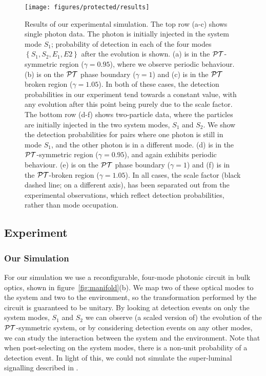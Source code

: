 \begin{figure*}[t]
  \centering
  \texttt{[image: figures/protected/results]}
  \caption[Results of simulation]
    {Results of our experimental simulation. The top row (a-c) shows
    single photon data. The photon is initially injected in the system mode
    \(S_1\); probability of detection in each of the four modes \(\left\{S_1,
    S_2, E_1, E2\right\}\) after the evolution is shown. (a) is in the
    \(\mathcal{PT}\)-symmetric region (\(\gamma=0.95\)), where we observe periodic
    behaviour. (b) is on the \(\mathcal{PT}\) phase boundary (\(\gamma=1\)) and (c) is
    in the \(\mathcal{PT}\) broken region (\(\gamma=1.05\)). In both of these cases,
    the detection probabilities in our
    experiment tend towards a constant value, with any evolution after this
    point being purely due to the scale factor. The bottom row (d-f) shows
    two-particle data, where the particles are initially injected in the two
    system modes, \(S_1\) and \(S_2\). We show the detection probabilities for
    pairs where one photon is still in mode \(S_1\), and the other photon is in
    a different mode. (d) is in the \(\mathcal{PT}\)-symmetric region (\(\gamma=0.95\)),
    and again exhibits periodic behaviour. (e) is on the \(\mathcal{PT}\) phase boundary
    (\(\gamma=1\)) and (f) is in the \(\mathcal{PT}\)-broken region (\(\gamma=1.05\)). In
    all cases, the scale factor (black dashed line; on a different axis), has
    been separated out from the experimental observations, which reflect
    detection probabilities, rather than mode occupation.}
  \label{fig:results}
\end{figure*}

\subsection{Experiment}
\subsubsection{Our Simulation}
For our simulation we use a reconfigurable, four-mode photonic circuit in bulk
optics, shown in figure~\ref{fig:manifold}(b). We map two of these optical modes
to the system and two to the environment, so the transformation performed by the
circuit is guaranteed to be unitary. By looking at detection events on only the
system modes, \(S_1\) and \(S_2\) we can observe (a scaled version of) the
evolution of the \(\mathcal{PT}\)-symmetric system, or by considering detection events on
any other modes, we can study the interaction between the system and the
environment. Note that when post-selecting on the system modes, there is a
non-unit probability of a detection event. In light of this, we could not
simulate the super-luminal signalling described in \cite{lee-prl-112-130404}.


